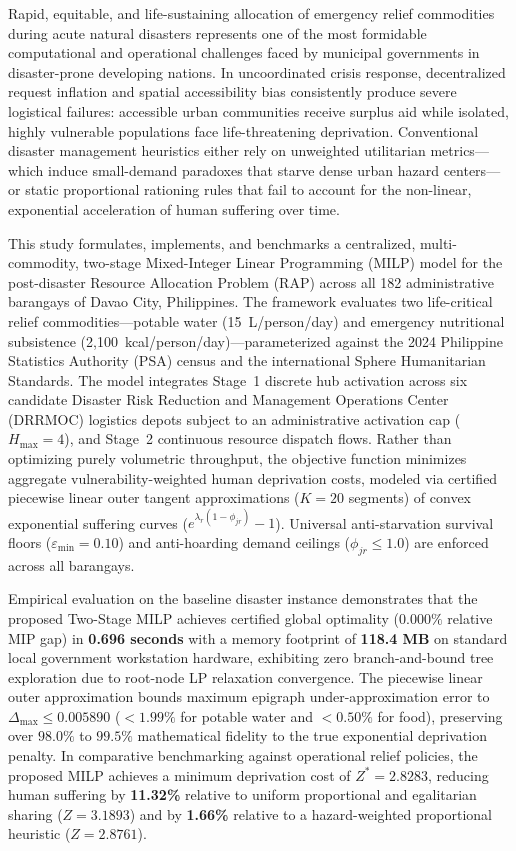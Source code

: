 Rapid, equitable, and life-sustaining allocation of emergency relief commodities during acute natural disasters represents one of the most formidable computational and operational challenges faced by municipal governments in disaster-prone developing nations. In uncoordinated crisis response, decentralized request inflation and spatial accessibility bias consistently produce severe logistical failures: accessible urban communities receive surplus aid while isolated, highly vulnerable populations face life-threatening deprivation. Conventional disaster management heuristics either rely on unweighted utilitarian metrics---which induce small-demand paradoxes that starve dense urban hazard centers---or static proportional rationing rules that fail to account for the non-linear, exponential acceleration of human suffering over time.

This study formulates, implements, and benchmarks a centralized, multi-commodity, two-stage Mixed-Integer Linear Programming (MILP) model for the post-disaster Resource Allocation Problem (RAP) across all 182 administrative barangays of Davao City, Philippines. The framework evaluates two life-critical relief commodities---potable water (15~L/person/day) and emergency nutritional subsistence (2,100~kcal/person/day)---parameterized against the 2024 Philippine Statistics Authority (PSA) census and the international Sphere Humanitarian Standards. The model integrates Stage~1 discrete hub activation across six candidate Disaster Risk Reduction and Management Operations Center (DRRMOC) logistics depots subject to an administrative activation cap ($H_{\max} = 4$), and Stage~2 continuous resource dispatch flows. Rather than optimizing purely volumetric throughput, the objective function minimizes aggregate vulnerability-weighted human deprivation costs, modeled via certified piecewise linear outer tangent approximations ($K = 20$ segments) of convex exponential suffering curves ($e^{\lambda_r(1-\phi_{jr})} - 1$). Universal anti-starvation survival floors ($\varepsilon_{\min} = 0.10$) and anti-hoarding demand ceilings ($\phi_{jr} \le 1.0$) are enforced across all barangays.

Empirical evaluation on the baseline disaster instance demonstrates that the proposed Two-Stage MILP achieves certified global optimality ($0.000\%$ relative MIP gap) in \textbf{0.696 seconds} with a memory footprint of \textbf{118.4 MB} on standard local government workstation hardware, exhibiting zero branch-and-bound tree exploration due to root-node LP relaxation convergence. The piecewise linear outer approximation bounds maximum epigraph under-approximation error to $\Delta_{\max} \le 0.005890$ ($< 1.99\%$ for potable water and $< 0.50\%$ for food), preserving over $98.0\%$ to $99.5\%$ mathematical fidelity to the true exponential deprivation penalty. In comparative benchmarking against operational relief policies, the proposed MILP achieves a minimum deprivation cost of $Z^* = \mathbf{2.8283}$, reducing human suffering by \textbf{11.32\%} relative to uniform proportional and egalitarian sharing ($Z = 3.1893$) and by \textbf{1.66\%} relative to a hazard-weighted proportional heuristic ($Z = 2.8761$). 

